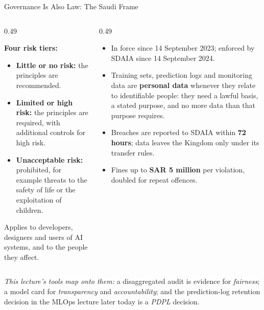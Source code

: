\begin{frame}{Governance Is Also Law: The Saudi Frame}
\begin{columns}[T]
\begin{column}{0.49\textwidth}
\begin{tcolorbox}[colback=raiBlue!5, colframe=raiBlue!60,
                              title={SDAIA AI Ethics Principles (2023)}]
                \vspace{0.4em}
                \textbf{Four risk tiers:}
                \begin{itemize}
                    \item \textbf{Little or no risk:} the principles are recommended.
                    \item \textbf{Limited or high risk:} the principles are required, with additional
                          controls for high risk.
                    \item \textbf{Unacceptable risk:} prohibited, for example threats to the safety of
                          life or the exploitation of children.
                \end{itemize}
                \vspace{0.2em}
                Applies to developers, designers and users of AI systems, and to the people they affect.
            \end{tcolorbox}
        \end{column}
        \begin{column}{0.49\textwidth}
            \begin{tcolorbox}[colback=gray!8, colframe=gray!60,
                              title={Personal Data Protection Law (PDPL)}]
                \scriptsize
                \begin{itemize}
                    \item In force since 14 September 2023; enforced by SDAIA since 14 September 2024.
                    \item Training sets, prediction logs and monitoring data are \textbf{personal data}
                          whenever they relate to identifiable people: they need a lawful basis, a stated
                          purpose, and no more data than that purpose requires.
                    \item Breaches are reported to SDAIA within \textbf{72 hours}; data leaves the Kingdom
                          only under its transfer rules.
                    \item Fines up to \textbf{SAR 5 million} per violation, doubled for repeat offences.
                \end{itemize}
            \end{tcolorbox}
        \end{column}
    \end{columns}

    \vspace{0.5em}
    \centering
    \small \textit{This lecture's tools map onto them:} a disaggregated audit is evidence for
    \emph{fairness}; a model card for \emph{transparency} and \emph{accountability}; and the
    prediction-log retention decision in the MLOps lecture later today is a \emph{PDPL} decision.

\end{frame}

